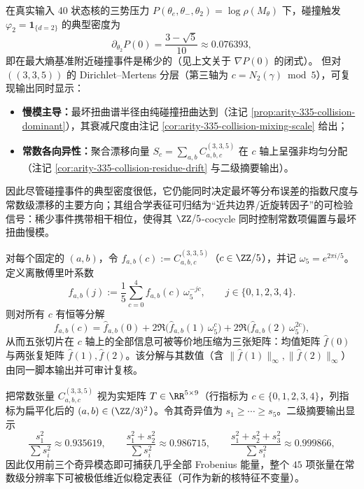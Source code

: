\begin{remark}\label{cor:arity-335-rare-collision-dominant}
在真实输入 40 状态核的三势压力 $P(\theta_e,\theta_-,\theta_2)=\log\rho(M_\theta)$ 下，碰撞触发 $\varphi_2=\mathbf{1}_{\{d=2\}}$ 的典型密度为
\[
\partial_{\theta_2}P(0)=\frac{3-\sqrt5}{10}\approx 0.076393,
\]
即在最大熵基准附近碰撞事件是稀少的（见上文关于 $\nabla P(0)$ 的闭式）。
但对 \(((3,3,5))\) 的 Dirichlet--Mertens 分层（第三轴为 $c=N_2(\gamma)\bmod 5$），可复现输出同时显示：
\begin{itemize}
  \item \textbf{慢模主导：}最坏扭曲谱半径由纯碰撞扭曲达到（注记 \ref{prop:arity-335-collision-dominant}），其衰减尺度由注记 \ref{cor:arity-335-collision-mixing-scale} 给出；
  \item \textbf{常数各向异性：}聚合漂移向量 $S_c=\sum_{a,b}C^{(3,3,5)}_{a,b,c}$ 在 $c$ 轴上呈强非均匀分配（注记 \ref{cor:arity-335-collision-residue-drift} 与二级摘要输出）。
\end{itemize}
因此尽管碰撞事件的典型密度很低，它仍能同时决定最坏等分布误差的指数尺度与常数级漂移的主要方向；其组合学表征可归结为“近共边界/近旋转因子”的可检验信号：稀少事件携带相干相位，使得其 \(\ZZ/5\)-cocycle 同时控制常数项偏置与最坏扭曲慢模。
\end{remark}

\begin{remark}\label{prop:arity-335-fourier-fingerprint}
对每个固定的 $(a,b)$，令 $f_{a,b}(c):=C^{(3,3,5)}_{a,b,c}$（$c\in\ZZ/5$），并记 $\omega_5=e^{2\pi i/5}$。定义离散傅里叶系数
\[
\widehat f_{a,b}(j):=\frac15\sum_{c=0}^{4} f_{a,b}(c)\,\omega_5^{-jc},
\qquad j\in\{0,1,2,3,4\}.
\]
则对所有 $c$ 有恒等分解
\[
f_{a,b}(c)
=\widehat f_{a,b}(0)
+2\Re\bigl(\widehat f_{a,b}(1)\,\omega_5^{c}\bigr)
+2\Re\bigl(\widehat f_{a,b}(2)\,\omega_5^{2c}\bigr),
\]
从而五张切片在 $c$ 轴上的全部信息可被等价地压缩为三张矩阵：均值矩阵 $\widehat f(0)$ 与两张复矩阵 $\widehat f(1),\widehat f(2)$。该分解与其数值（含 $\|\widehat f(1)\|_\infty,\|\widehat f(2)\|_\infty$）由同一脚本输出并可审计复核。
\end{remark}

\begin{remark}\label{prop:arity-335-low-rank}
把常数张量 $C^{(3,3,5)}_{a,b,c}$ 视为实矩阵 $T\in\RR^{5\times 9}$（行指标为 $c\in\{0,1,2,3,4\}$，列指标为扁平化后的 $(a,b)\in(\ZZ/3)^2$）。令其奇异值为 $s_1\ge \cdots\ge s_5$。二级摘要输出显示
\[
\frac{s_1^2}{\sum s_i^2}\approx 0.935619,\qquad
\frac{s_1^2+s_2^2}{\sum s_i^2}\approx 0.986715,\qquad
\frac{s_1^2+s_2^2+s_3^2}{\sum s_i^2}\approx 0.999866,
\]
因此仅用前三个奇异模态即可捕获几乎全部 Frobenius 能量，整个 $45$ 项张量在常数级分辨率下可被极低维近似稳定表征（可作为新的核特征不变量）。
\end{remark}

